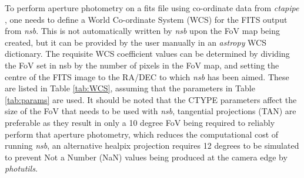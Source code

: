 To perform aperture photometry on a fits file using co-ordinate data from \textit{ctapipe} \cite{ctapipe2}, one needs to define a World Co-ordinate System (WCS) for the FITS output from \textit{nsb}. This is not automatically written by \textit{nsb} upon the FoV map being created, but it can be provided by the user manually in an \textit{astropy} WCS dictionary. The requisite WCS coefficient values can be determined by dividing the FoV set in nsb by the number of pixels in the FoV map, and setting the centre of the FITS image to the RA/DEC to which \textit{nsb} has been aimed. These are listed in Table \ref{tab:WCS}, assuming that the parameters in Table \ref{tab:params} are used. It should be noted that the CTYPE parameters affect the size of the FoV that needs to be used with \textit{nsb}, tangential projections (TAN) are preferable as they result in only a 10 degree FoV being required to reliably perform that aperture photometry, which reduces the computational cost of running \textit{nsb}, an alternative healpix projection requires 12 degrees to be simulated to prevent Not a Number (NaN) values being produced at the camera edge by \textit{photutils}.
\begin{table}[]
    \centering
    \caption{WCS dictionary headers and parameters recommended for SSTCAM, assuming the configuration in Table \ref{tab:params}. Note the CTYPEn projection used affects the necessary size of the FoV map generated by \textit{nsb}. The rotation parameters CROTA1 and CROTA2 are degenerate in their effect, and are not trivially set.}
    \label{tab:WCS}
\end{table}

